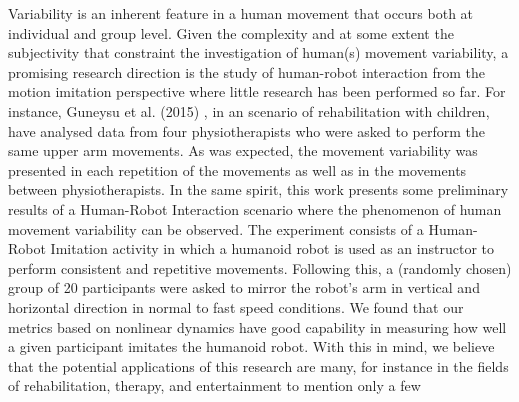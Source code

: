 \documentclass[a4paper]{article}
\begin{document}
Variability is an inherent feature in a human movement that occurs both at
individual and group level. Given the complexity and at some extent the
subjectivity that constraint the investigation of human(s) movement variability,
a promising research direction is the study of human-robot interaction from
the motion imitation perspective where little research has been performed so far.
For instance, Guneysu et al. (2015) \cite{guneysu2015children},
in an scenario of rehabilitation with children, have analysed data from
four physiotherapists who were asked to perform the same upper arm movements.
As was expected, the movement variability was presented in each repetition
of the movements as well as in the movements between physiotherapists.
In the same spirit, this work presents some preliminary results
of a Human-Robot Interaction scenario where the phenomenon
of human movement variability
can be observed.
The experiment consists of a Human-Robot Imitation activity in which a humanoid
robot is used as an instructor to perform consistent and repetitive movements.
Following this, a (randomly chosen) group of
20 participants were asked to mirror the robot's arm in vertical and horizontal
direction in normal to fast speed conditions.
We found that our metrics based on nonlinear dynamics have
good
capability in measuring how well a given participant imitates the humanoid robot.
With this in mind, we believe that the potential applications of this research
are many, for instance in the fields of rehabilitation, therapy,
and entertainment to mention only a few




%
%
%




\end{document}
